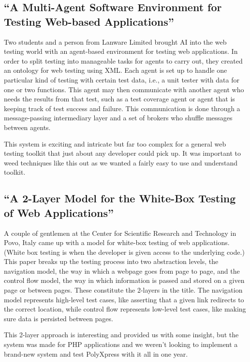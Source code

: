 \documentclass[12pt]{ucthesis}
\begin{document}
\subsection{``A Multi-Agent Software Environment for Testing Web-based Applications''}
Two students and a person from Lanware Limited brought AI into the web testing world with an agent-based environment for testing web applications\cite{MultiAgentSoftwareEnvironment}. In order to split testing into manageable tasks for agents to carry out, they created an ontology for web testing using XML. Each agent is set up to handle one particular kind of testing with certain test data, i.e., a unit tester with data for one or two functions. This agent may then communicate with another agent who needs the results from that test, such as a test coverage agent or agent that is keeping track of test success and failure. This communication is done through a message-passing intermediary layer and a set of brokers who shuffle messages between agents.

This system is exciting and intricate but far too complex for a general web testing toolkit that just about any developer could pick up. It was important to weed techniques like this out as we wanted a fairly easy to use and understand toolkit.

\subsection{``A 2-Layer Model for the White-Box Testing of Web Applications''}
A couple of gentlemen at the Center for Scientific Research and Technology in Povo, Italy came up with a model for white-box testing of web applications\cite{2LayerModel}. (White box testing is when the developer is given access to the underlying code.) This paper breaks up the testing process into two abstraction levels, the navigation model, the way in which a webpage goes from page to page, and the control flow model, the way in which information is passed and stored on a given page or between pages. These constitute the 2-layers in the title. The navigation model represents high-level test cases, like asserting that a given link redirects to the correct location, while control flow represents low-level test cases, like making sure data is persisted between pages. 

This 2-layer approach is interesting and provided us with some insight, but the system was made for PHP applications and we weren't looking to implement a brand-new system and test PolyXpress with it all in one year.
\end{document}

